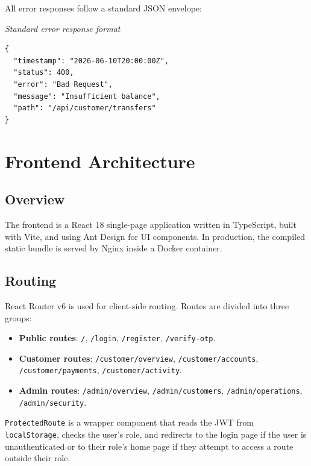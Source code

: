 \documentclass[12pt,a4paper]{report}
\begin{document}
All error responses follow a standard JSON envelope:


\textit{\small Standard error response format}\vspace{2pt}
\begin{Verbatim}[frame=single,fontsize=\small,bgcolor=codegray]
{
  "timestamp": "2026-06-10T20:00:00Z",
  "status": 400,
  "error": "Bad Request",
  "message": "Insufficient balance",
  "path": "/api/customer/transfers"
}
\end{Verbatim}


\chapter{Frontend Architecture}
\label{ch:frontend}

\section{Overview}

The frontend is a React 18 single-page application written in TypeScript, built with
Vite, and using Ant Design for UI components. In production, the compiled static bundle
is served by Nginx inside a Docker container.

\section{Routing}

React Router v6 is used for client-side routing. Routes are divided into three groups:

\begin{itemize}
  \item \textbf{Public routes}: \texttt{/}, \texttt{/login}, \texttt{/register},
        \texttt{/verify-otp}.
  \item \textbf{Customer routes}: \texttt{/customer/overview}, \texttt{/customer/accounts},
        \texttt{/customer/payments}, \texttt{/customer/activity}.
  \item \textbf{Admin routes}: \texttt{/admin/overview}, \texttt{/admin/customers},
        \texttt{/admin/operations}, \texttt{/admin/security}.
\end{itemize}

\texttt{ProtectedRoute} is a wrapper component that reads the JWT from
\texttt{localStorage}, checks the user's role, and redirects to the login page if
the user is unauthenticated or to their role's home page if they attempt to access
a route outside their role.
\end{document}
